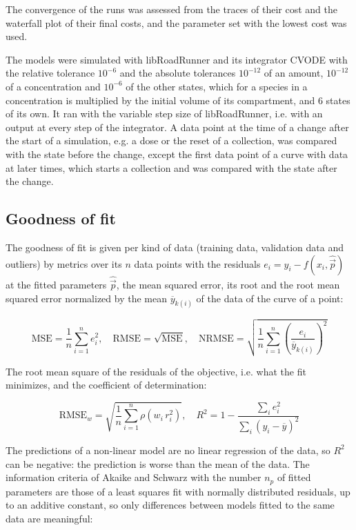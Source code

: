 The convergence of the runs was assessed from the traces of their cost and the waterfall plot of their final costs, and the parameter set with the lowest cost was used.

The models were simulated with libRoadRunner \cite{Welsh2023} and its integrator CVODE \cite{Hindmarsh2005} with the relative tolerance $10^{-6}$ and the absolute tolerances $10^{-12}$ of an amount, $10^{-12}$ of a concentration and $10^{-6}$ of the other states, which for a species in a concentration is multiplied by the initial volume of its compartment, and 6 states of its own. It ran with the variable step size of libRoadRunner, i.e. with an output at every step of the integrator. A data point at the time of a change after the start of a simulation, e.g. a dose or the reset of a collection, was compared with the state before the change, except the first data point of a curve with data at later times, which starts a collection and was compared with the state after the change.

\subsection{Goodness of fit}

The goodness of fit is given per kind of data (training data, validation data and outliers) by metrics over its $n$ data points with the residuals $e_i = y_i - f(x_i, \hat{\vec{p}})$ at the fitted parameters $\hat{\vec{p}}$, the mean squared error, its root and the root mean squared error normalized by the mean $\overline{y}_{k(i)}$ of the data of the curve of a point:

\begin{equation}
\mathrm{MSE} = \frac{1}{n} \sum_{i=1}^{n} e_i^2, \quad \mathrm{RMSE} = \sqrt{\mathrm{MSE}}, \quad \mathrm{NRMSE} = \sqrt{\frac{1}{n} \sum_{i=1}^{n} \left(\frac{e_i}{\overline{y}_{k(i)}}\right)^2}
\end{equation}

The root mean square of the residuals of the objective, i.e. what the fit minimizes, and the coefficient of determination:

\begin{equation}
\mathrm{RMSE}_w = \sqrt{\frac{1}{n} \sum_{i=1}^{n} \rho\left(w_i\, r_i^2\right)}, \quad R^2 = 1 - \frac{\sum_{i} e_i^2}{\sum_{i} \left(y_i - \overline{y}\right)^2}
\end{equation}

The predictions of a non-linear model are no linear regression of the data, so $R^2$ can be negative: the prediction is worse than the mean of the data. The information criteria of Akaike \cite{Akaike1974} and Schwarz \cite{Schwarz1978} with the number $n_p$ of fitted parameters are those of a least squares fit with normally distributed residuals, up to an additive constant, so only differences between models fitted to the same data are meaningful:

